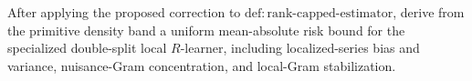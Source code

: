 After applying the proposed correction to \(\mathrm{def:rank\mbox{-}capped\mbox{-}estimator}\), derive from the primitive density band a uniform mean-absolute risk bound for the specialized double-split local \(R\)-learner, including localized-series bias and variance, nuisance-Gram concentration, and local-Gram stabilization.